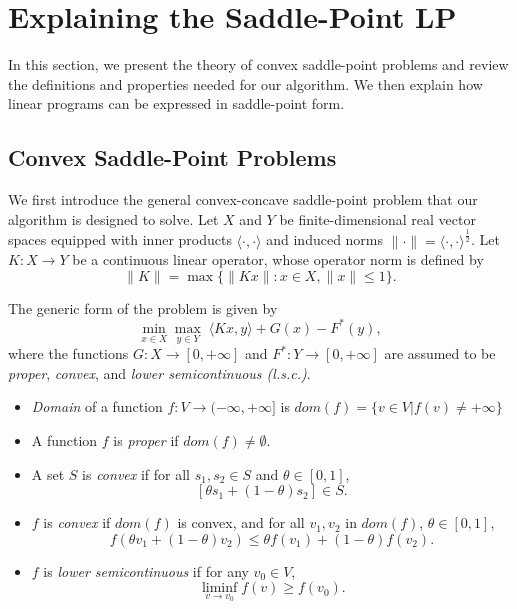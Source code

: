 \documentclass[twoside,12pt,openright]{report}  %
\begin{document}
\section{Explaining the Saddle-Point LP}
In this section, we present the theory of convex saddle-point problems and review the definitions and properties needed for our algorithm. We then explain how linear programs can be expressed in saddle-point form.
\subsection{Convex Saddle-Point Problems}
We first introduce the general convex-concave saddle-point problem that our algorithm is designed to solve. Let \( X \) and \( Y \) be finite-dimensional real vector spaces equipped with inner products \(\langle \cdot, \cdot \rangle\) and induced norms \(\| \cdot \| = \langle \cdot, \cdot \rangle ^ \frac{1}{2} \). Let \( K : X \to Y \) be a continuous linear operator, whose operator norm is defined by
\begin{equation}
    \|K\| = \max \{ \|Kx\| : x \in X, \|x\| \le 1 \}.
\end{equation}

The generic form of the problem is given by
\begin{equation}
    \min_{x \in X} \max_{y \in Y} \; \langle Kx, y \rangle + G(x) - F^*(y),
    \label{eq:saddle-point}
\end{equation}
where the functions \( G : X \to [0, +\infty] \) and \( F^* : Y \to [0, +\infty] \) are assumed to be \emph{proper}, \emph{convex}, and \emph{lower semicontinuous (l.s.c.)}. 

\begin{itemize}
    \item \emph{Domain} of a function \( f : V \to (-\infty, +\infty] \) is \( dom(f) = \{v \in V | f(v) \neq + \infty\}\)
    
    \item A function \(f\) is \emph{proper} if \(dom(f) \neq \emptyset \).
    
    \item A set \(S\) is \emph{convex} if for all \(s_1,s_2 \in S\) and \( \theta \in [0,1] \), 
    \[
    [ \theta s_1 + (1-\theta) s_2 ] \in S.
    \]
    
    \item \( f \) is \emph{convex} if \(dom(f)\) is convex, and for all \( v_1, v_2 \) in \(dom(f)\), \( \theta \in [0,1] \),
    \[
    f(\theta v_1 + (1 - \theta) v_2) \le \theta f(v_1) + (1 - \theta) f(v_2).
    \]
    \item \( f \) is \emph{lower semicontinuous} if for any \(v_0 \in V\),
    \[
    \liminf_{v \to v_0} f(v) \ge f(v_0).
    \]
\end{itemize}
\end{document}
